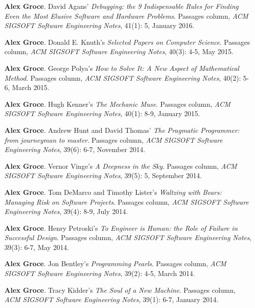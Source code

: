 \documentclass[ComputerScience]{vita}
\begin{document}
\begin{vita}
\begin{Columns, Book Reviews, and Magazine Articles}
\item {\bf Alex Groce}.
\newblock David Agans' \emph{Debugging: the 9 Indispensable Rules for Finding Even the Most Elusive Software and Hardware Problems}. 
\newblock Passages column, \emph{ACM SIGSOFT Software Engineering Notes}, 41(1): 5, January 2016.


\item {\bf Alex Groce}.
\newblock Donald E. Knuth's \emph{Selected Papers on Computer Science}.
\newblock Passages column, \emph{ACM SIGSOFT Software Engineering Notes}, 40(3): 4-5, May 2015.

\item{\bf Alex Groce}.
\newblock George Polya's \emph{How to Solve It: A New Aspect of Mathematical Method}.
\newblock Passages column, \emph{ACM SIGSOFT Software Engineering Notes}, 40(2): 5-6, March 2015.

\item {\bf Alex Groce}.
\newblock Hugh Kenner's \emph{The Mechanic Muse}.
\newblock Passages column, \emph{ACM SIGSOFT Software Engineering Notes}, 40(1): 8-9, January 2015.

\item {\bf Alex Groce}.
\newblock Andrew Hunt and David Thomas' \emph{The Pragmatic Programmer: from journeyman to master}.
\newblock Passages column, \emph{ACM SIGSOFT Software Engineering Notes}, 39(6): 6-7, November 2014.

\item {\bf Alex Groce}.
\newblock Vernor Vinge's \emph{A Deepness in the Sky}.
\newblock Passages column, \emph{ACM SIGSOFT Software Engineering Notes}, 39(5): 5, September 2014.

\item {\bf Alex Groce}.
\newblock Tom DeMarco and Timothy Lister's \emph{Waltzing with Bears: Managing Risk on Software Projects}.
\newblock Passages column, \emph{ACM SIGSOFT Software Engineering Notes}, 39(4): 8-9, July 2014.

\item {\bf Alex Groce}.
\newblock Henry Petroski's \emph{To Engineer is Human: the Role of Failure in Successful Design}.
\newblock Passages column, \emph{ACM SIGSOFT Software Engineering Notes}, 39(3): 6-7, May 2014.

\item {\bf Alex Groce}.
\newblock Jon Bentley's \emph{Programming Pearls}.
\newblock Passages column, \emph{ACM SIGSOFT Software Engineering Notes}, 39(2): 4-5, March 2014.

\item {\bf Alex Groce}.
\newblock Tracy Kidder's \emph{The Soul of a New Machine}.
\newblock Passages column, \emph{ACM SIGSOFT Software Engineering Notes}, 39(1): 6-7, January 2014.


\end{Columns, Book Reviews, and Magazine Articles}
\end{vita}
\end{document}
